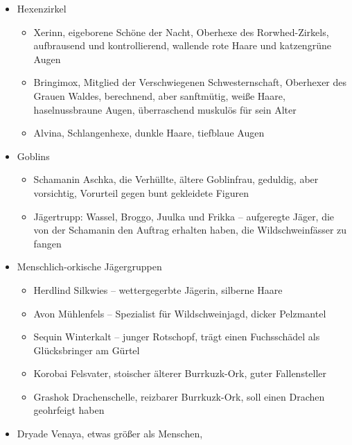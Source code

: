      \begin{itemize}
   	\item Hexenzirkel
                \begin{itemize}
        	\item  Xerinn, eigeborene Schöne der Nacht, Oberhexe des Rorwhed-Zirkels, aufbrausend und kontrollierend, wallende rote Haare und katzengrüne Augen
       \item Bringimox, Mitglied der Verschwiegenen Schwesternschaft, Oberhexer des Grauen Waldes, berechnend, aber sanftmütig, weiße Haare, haselnussbraune Augen, überraschend muskulös für sein Alter
        \item Alvina, Schlangenhexe, dunkle Haare, tiefblaue Augen
        \end{itemize}
    \item Goblins
                \begin{itemize}
        	\item  Schamanin Aschka, die Verhüllte, ältere Goblinfrau, geduldig, aber vorsichtig, Vorurteil gegen bunt gekleidete Figuren
        \item Jägertrupp: Wassel, Broggo, Juulka und Frikka -- aufgeregte Jäger, die von der Schamanin den Auftrag erhalten haben, die Wildschweinfässer zu fangen
        \end{itemize}
    \item Menschlich-orkische Jägergruppen
            \begin{itemize}
    	\item Herdlind Silkwies -- wettergegerbte Jägerin, silberne Haare
        \item Avon Mühlenfels -- Spezialist für Wildschweinjagd, dicker Pelzmantel
        \item Sequin Winterkalt -- junger Rotschopf, trägt einen Fuchsschädel als Glücksbringer am Gürtel
        \item Korobai Felsvater, stoischer älterer Burrkuzk-Ork, guter Fallensteller
        \item Grashok Drachenschelle, reizbarer Burrkuzk-Ork, soll einen Drachen geohrfeigt haben
        \end{itemize}
    \item Dryade Venaya, etwas größer als Menschen, 
    \end{itemize}


